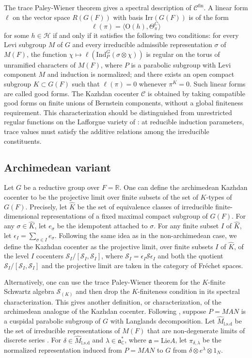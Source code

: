 \documentclass[iccmp]{ipbook}
\newcommand{\BC}{{\mathbb {C}}}
\newcommand{\BR}{{\mathbb {R}}}
\newcommand{\CC}{{\mathcal {C}}}
\newcommand{\CH}{{\mathcal {H}}}
\newcommand{\CS}{{\mathcal {S}}}
\newcommand{\Fa}{{\mathfrak {a}}}
\newcommand{\RO}{{\mathrm {O}}}
\newcommand{\Ind}{{\mathrm{Ind}}}
\newcommand{\Lie}{{\mathrm{Lie}}}
\def\del{{\delta}}
\def\eps{{\epsilon}}
\def\sig{{\sigma}}
\def\lam{{\lambda}}
\newcommand{\fin}{\mathrm{fin}}
\def\Irr{\mathrm{Irr}}
\begin{document}
The trace Paley-Wiener theorem \cite{MR874050} gives a spectral description of $\CC^\fin$. A linear form $\ell$ on the vector space $R(G(F))$ with basis $\Irr(G(F))$ is of the form
$$
\ell(\pi) = \langle \RO(h),\Theta^C_\pi\rangle
$$
for some $h\in \CH$ if and only if it satisfies the following two conditions: for every Levi subgroup $M$ of $G$ and every irreducible admissible representation $\sig$ of $M(F)$, the function $\chi\mapsto\ell(\Ind_P^G(\sig\otimes\chi))$ is regular on the torus of unramified characters of $M(F)$, where $P$ is a parabolic subgroup with Levi component $M$ and induction is normalized; and there exists an open compact subgroup $K\subset G(F)$ such that $\ell(\pi)=0$ whenever $\pi^K=0$. Such linear forms are called good forms. The Kazhdan cocenter $\CC$ is obtained by taking compatible good forms on finite unions of Bernstein components, without a global finiteness requirement. This characterization should be distinguished from unrestricted regular functions on the Lafforgue variety of \cite{psaromiligkos_lafforgue_2023}: at reducible induction parameters, trace values must satisfy the additive relations among the irreducible constituents.


\subsection{Archimedean variant}

Let $G$ be a reductive group over $F=\BR$. One can define the archimedean Kazhdan cocenter to be the projective limit over finite subsets of the set of $K$-types of $G(F)$. Precisely, let $\hat{K}$ be the set of equivalence classes of irreducible finite-dimensional representations of a fixed maximal compact subgroup of $G(F)$. For any $\sig\in \hat{K}$, let $e_\sig$ be the idempotent attached to $\sig$. For any finite subset $I$ of $\hat{K}$, let $\eps_I = \sum_{\sig\in I}e_\sig$. Following the same idea as in the non-archimedean case, we define the Kazhdan cocenter as the projective limit, over finite subsets $I$ of $\hat{K}$, of the level $I$ cocenters $\CS_I/[\CS_I,\CS_I]$, where $\CS_I = \eps_I\CS \eps_I$ and both the quotient $\CS_I/[\CS_I,\CS_I]$ and the projective limit are taken in the category of Fréchet spaces.

Alternatively, one can use the trace Paley-Wiener theorem for the $K$-finite Schwartz algebra $\CS_{(K)}$ and then drop the $K$-finiteness condition in its spectral characterization. This gives another definition, or characterization, of the archimedean analogue of the Kazhdan cocenter. Following \cite[Théorème~1.9]{MR0860667}, suppose $P=MAN$ is a cuspidal parabolic subgroup of $G$ with Langlands decomposition. Let $\hat{M}_{\mathrm{l.s.d}}$ be the set of irreducible representations of $M(F)$ that are non-degenerate limits of discrete series \cite[\S 12]{MR672840}. For $\del\in \hat{M}_{\mathrm{l.s.d}}$ and $\lam\in \Fa^*_\BC$, where $\Fa = \Lie A$, let $\pi_{\del,\lam}$ be the normalized representation induced from $P=MAN$ to $G$ from $\del\otimes e^\lam\otimes 1_N$.
\end{document}
